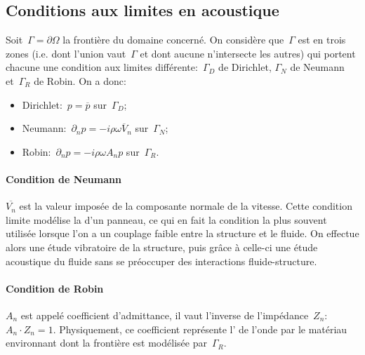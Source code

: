 \subsection{Conditions aux limites en acoustique}
Soit~$\Gamma=\partial\Omega$ la frontière du domaine concerné. On considère que~$\Gamma$ est  en trois zones (i.e. dont l'union vaut~$\Gamma$ et dont aucune n'intersecte les autres) qui portent chacune une condition aux limites différente:~$\Gamma_D$ de Dirichlet, $\Gamma_N$ de Neumann et~$\Gamma_R$ de Robin.
\medskipvm
On a donc:
\begin{itemize}
  \item Dirichlet:~$p=\overline{p}$ sur~$\Gamma_D$;\\[-2ex]
  \item Neumann:~$\partial_n p = -i\rho\omega \overline{V}_n$ sur~$\Gamma_N$;\\[-2ex]
  \item Robin:~$\partial_n p=-i\rho\omega A_n p$ sur~$\Gamma_R$.
\end{itemize}
\medskipvm{}
\paragraph{Condition de Neumann}
$\overline{V_n}$ est la valeur imposée de la composante normale de la vitesse. Cette condition limite modélise la  d'un panneau, ce qui en fait la condition la plus souvent utilisée lorsque l'on a un couplage faible entre la structure et le fluide. On effectue alors une étude vibratoire de la structure, puis grâce à celle-ci une étude acoustique du fluide sans se préoccuper des interactions fluide-structure.

\medskip
\paragraph{Condition de Robin}
$A_n$ est appelé coefficient d'admittance, il vaut l'inverse de l'impédance~$Z_n$:
$A_n\cdot Z_n=1$. Physiquement, ce coefficient représente l' de l'onde par le matériau environnant dont la frontière est modélisée par~$\Gamma_R$.

\medskip
